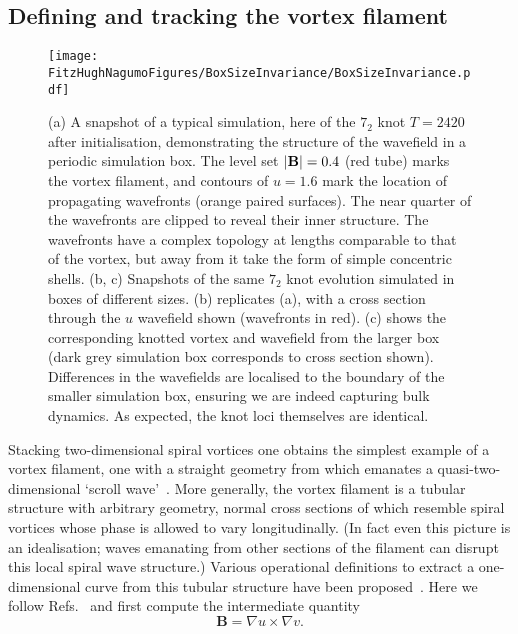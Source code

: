 \subsection{Defining and tracking the vortex filament}
\label{subsec:DefiningTracking}
\begin{figure}[htbp]
    \texttt{[image: \\FitzHughNagumoFigures/BoxSizeInvariance/BoxSizeInvariance.pdf]}
    \caption{\label{fig:TypicalSimulation} (a) A snapshot of a typical simulation, here of the $7_2$ knot $T=2420$ after initialisation, demonstrating the structure of the wavefield in a periodic simulation box. The level set $|{\bf B}|=0.4$ (red tube) marks the vortex filament, and contours of $ u = 1.6$ mark the location of propagating wavefronts (orange paired surfaces). The near quarter of the wavefronts are clipped to reveal their inner structure. The wavefronts have a complex topology at lengths comparable to that of the vortex, but away from it take the form of simple concentric shells. (b, c) Snapshots of the same $7_2$ knot evolution simulated in boxes of different sizes. (b) replicates (a), with a cross section through the $u$ wavefield shown (wavefronts in red). (c) shows the corresponding knotted vortex and wavefield from the larger box (dark grey simulation box corresponds to cross section shown). Differences in the wavefields are localised to the boundary of the smaller simulation box, ensuring we are indeed capturing bulk dynamics. As expected, the knot loci themselves are identical.}
\end{figure}
Stacking two-dimensional spiral vortices one obtains the simplest example of a vortex filament, one with a straight geometry from which emanates a quasi-two-dimensional `scroll wave'~\citep{Winfree1983}. More generally, the vortex filament is a tubular structure with arbitrary geometry, normal cross sections of which resemble spiral vortices whose phase is allowed to vary longitudinally. (In fact even this picture is an idealisation; waves emanating from other sections of the filament can disrupt this local spiral wave structure.) Various operational definitions to extract a one-dimensional curve from this tubular structure have been proposed~\citep{Winfree1990,Henze1993,Dowle1997}. Here we follow Refs.~\citep{Sutcliffe2003,Maucher2016,Maucher2017,Maucher2018,Maucher2019} and first compute the intermediate quantity
\begin{equation}
\label{eq:ucrossv}
\mathbf{B} = \nabla u \times \nabla v.
\end{equation}
